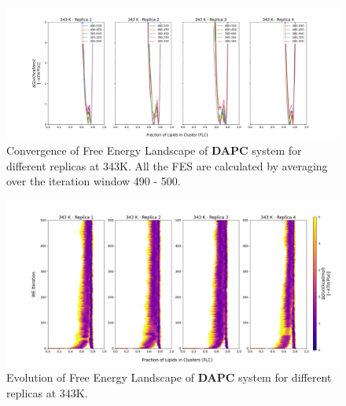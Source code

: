 \documentclass{biophys-new}
\begin{document}
\begin{figure}[hbt!]
\centering
\includegraphics[width=1.1\linewidth]{all_plots/ClusterLipids2Total/DPPC_DAPC_CHOL/343K/Convergence_DAPC_343_ClusterLipids2Total.png}
\caption{Convergence of Free Energy Landscape of \textbf{DAPC} system for different replicas at 343K. All the FES are calculated by averaging over the iteration window 490 - 500.}
\label{fig:view}

\end{figure}

\begin{figure}[hbt!]
\centering
\includegraphics[width=1.1\linewidth]{all_plots/ClusterLipids2Total/DPPC_DAPC_CHOL/343K/Evolution_DAPC_343_ClusterLipids2Total.png}
\caption{Evolution of Free Energy Landscape of \textbf{DAPC} system for different replicas at 343K.}
\label{fig:view}

\end{figure}
\end{document}
